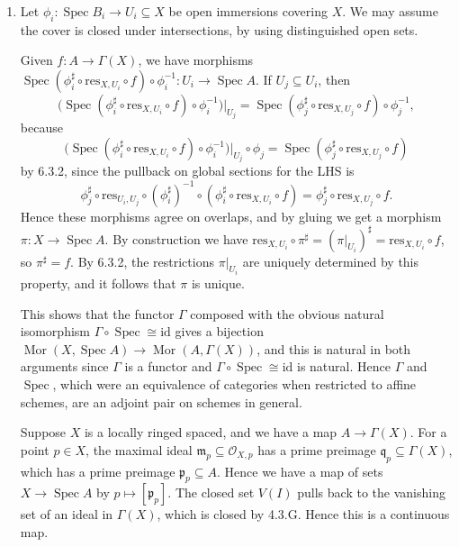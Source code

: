 \documentclass{report}
\newcommand{\id}{{\mathrm{id}}} %
\newcommand{\res}{{\mathrm{res}}} %
\newcommand{\m}{\mathfrak{m}}
\newcommand{\p}{\mathfrak{p}}
\newcommand{\q}{\mathfrak{q}}
\renewcommand{\O}{\mathscr{O}} %
\DeclareMathOperator{\Mor}{Mor}
\DeclareMathOperator{\Spec}{Spec}
\begin{document}
\begin{enumerate}[label=\textbf{6.3.\Alph*.}]
	\item
	      { \color{gray}
	      Let $\phi_i:\Spec B_i\to U_i\subseteq X$ be open immersions covering
	      $X$. We may assume the cover is closed under intersections, by using
	      distinguished open sets.

	      Given $f:A\to\Gamma(X)$, we have morphisms
	      $\Spec(\phi_i^\sharp\circ\res_{X,U_i}\circ f)\circ\phi_i^{-1}:U_i\to\Spec A$.
	      If $U_j\subseteq U_i$, then
	      \begin{equation*}
		      \bigl(\Spec(\phi_i^\sharp\circ\res_{X,U_i}\circ f)
		      \circ\phi_i^{-1}\bigr)|_{U_j}
		      = \Spec(\phi_j^\sharp\circ\res_{X,U_j}\circ f)\circ\phi_j^{-1},
	      \end{equation*}
	      because
	      \begin{equation*}
		      \bigl(\Spec(\phi_i^\sharp\circ\res_{X,U_i}\circ f)
		      \circ\phi_i^{-1}\bigr)|_{U_j}\circ\phi_j
		      = \Spec(\phi_j^\sharp\circ\res_{X,U_j}\circ f)
	      \end{equation*}
	      by 6.3.2, since the pullback on global sections for the LHS is
	      \begin{equation*}
		      \phi_j^\sharp\circ\res_{U_i,U_j}\circ(\phi_i^\sharp)^{-1}\circ
		      (\phi_i^\sharp\circ\res_{X,U_i}\circ f)
		      = \phi_j^\sharp\circ\res_{X,U_j}\circ f.
	      \end{equation*}
	      Hence these morphisms agree on overlaps, and by gluing we get a morphism
	      $\pi:X\to\Spec A$. By construction we have
	      $\res_{X,U_i}\circ \pi^\sharp=(\pi|_{U_i})^\sharp=\res_{X,U_i}\circ f$,
	      so $\pi^\sharp=f$. By 6.3.2, the restrictions $\pi|_{U_i}$ are uniquely
	      determined by this property, and it follows that $\pi$ is unique.

	      This shows that the functor $\Gamma$ composed with the obvious natural
	      isomorphism $\Gamma\circ\Spec\cong\id$ gives a bijection
	      $\Mor(X,\Spec A)\to\Mor(A,\Gamma(X))$, and this is natural in both
	      arguments since $\Gamma$ is a functor and $\Gamma\circ\Spec\cong\id$ is
	      natural. Hence $\Gamma$ and $\Spec$, which were an equivalence of
	      categories when restricted to affine schemes, are an adjoint pair on
	      schemes in general.
	      }

	      Suppose $X$ is a locally ringed spaced, and we have a map
	      $A\to\Gamma(X)$. For a point $p\in X$, the maximal ideal
	      $\m_p\subseteq\O_{X,p}$ has a prime preimage $\q_p\subseteq\Gamma(X)$,
	      which has a prime preimage $\p_p\subseteq A$. Hence we have a map of
	      sets $X\to\Spec A$ by $p\mapsto[\p_p]$. The closed set $V(I)$ pulls
	      back to the vanishing set of an ideal in $\Gamma(X)$, which is closed
	      by 4.3.G. Hence this is a continuous map.


\end{enumerate}
\end{document}
